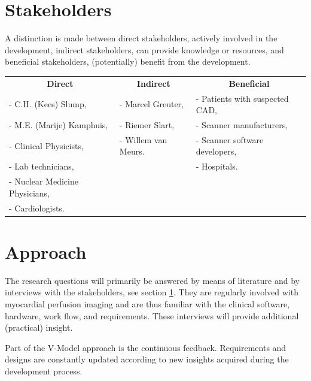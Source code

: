 \section{Stakeholders}
\label{sec:stakeholders}
A distinction is made between direct stakeholders, actively involved in the development, indirect stakeholders, can provide knowledge or resources, and beneficial stakeholders, (potentially) benefit from the development.

\begin{tabular}{lll}
 	\multicolumn{1}{c}{\textbf{Direct}} & \multicolumn{1}{c}{\textbf{Indirect}} & \multicolumn{1}{c}{\textbf{Beneficial}} \\
	 - C.H. (Kees) Slump, &  - Marcel Greuter, & - Patients with suspected \ac{CAD}, \\
	 - M.E. (Marije) Kamphuis, & - Riemer Slart, & - Scanner manufacturers,\\
	 - Clinical Physicists, & - Willem van Meurs. & - Scanner software developers, \\
	 - Lab technicians, & & - Hospitals. \\
	 - Nuclear Medicine Physicians, & & \\
	 - Cardiologists. & & \\
\end{tabular}

\section{Approach}
The research questions will primarily be answered by means of literature and by interviews with the stakeholders, see section \ref{sec:stakeholders}. They are regularly involved with myocardial perfusion imaging and are thus familiar with the clinical software, hardware, work flow, and requirements. These interviews will provide additional (practical) insight.

Part of the V-Model approach is the continuous feedback. Requirements and designs are constantly updated according to new insights acquired during the development process. 


